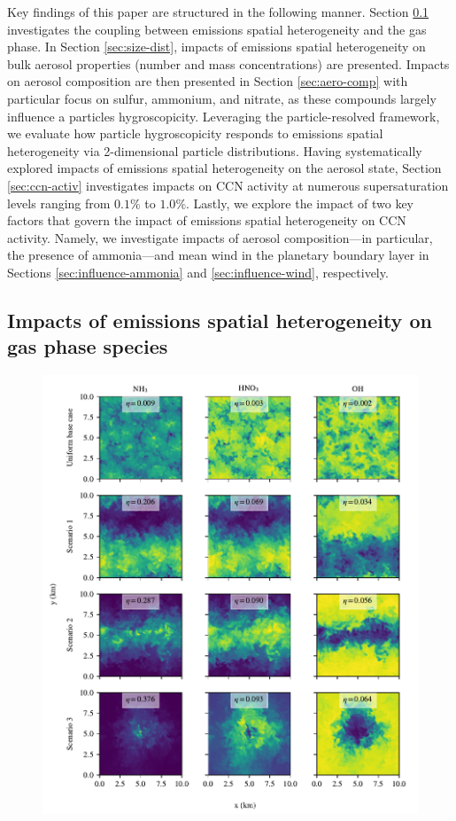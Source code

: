 \documentclass[journal abbreviation, manuscript]{copernicus}
\begin{document}
Key findings of this paper are structured in the following manner. Section \ref{sec:gas-impacts} investigates the coupling between emissions spatial heterogeneity and the gas phase. In Section \ref{sec:size-dist}, impacts of emissions spatial heterogeneity on bulk aerosol properties (number and mass concentrations) are presented. Impacts on aerosol composition are then presented in Section \ref{sec:aero-comp} with particular focus on sulfur, ammonium, and nitrate, as these compounds largely influence a particles hygroscopicity. Leveraging the particle-resolved framework, we evaluate how particle hygroscopicity responds to emissions spatial heterogeneity via 2-dimensional particle distributions. Having systematically explored impacts of emissions spatial heterogeneity on the aerosol state, Section \ref{sec:ccn-activ}  investigates impacts on CCN activity at numerous supersaturation levels ranging from $0.1\%$ to $1.0\%$. Lastly, we explore the impact of two key factors that govern the impact of emissions spatial heterogeneity on CCN activity. Namely, we investigate impacts of aerosol composition---in particular, the presence of ammonia---and mean wind in the planetary boundary layer in Sections \ref{sec:influence-ammonia} and \ref{sec:influence-wind}, respectively. 

\subsection{Impacts of emissions spatial heterogeneity on gas phase species}\label{sec:gas-impacts}

\begin{figure}[!h]
	\centering
	\includegraphics[]{figures/gas-spatial-heterogeneity-time36-z45.pdf}
	\caption{}
	\label{fig:gas-cross-sec}
\end{figure} 
\end{document}
